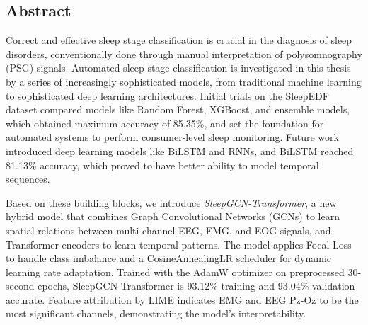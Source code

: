 \begin{center}
	\section*{\textcolor{internationalkleinblue}{\textbf{{Abstract}}}}
\end{center}

Correct and effective sleep stage classification is crucial in the diagnosis of sleep disorders, conventionally done through manual interpretation of polysomnography (PSG) signals. Automated sleep stage classification is investigated in this thesis by a series of increasingly sophisticated models, from traditional machine learning to sophisticated deep learning architectures. Initial trials on the SleepEDF dataset compared models like Random Forest, XGBoost, and ensemble models, which obtained maximum accuracy of 85.35\%, and set the foundation for automated systems to perform consumer-level sleep monitoring. Future work introduced deep learning models like BiLSTM and RNNs, and BiLSTM reached 81.13\% accuracy, which proved to have better ability to model temporal sequences.

Based on these building blocks, we introduce \textit{SleepGCN-Transformer}, a new hybrid model that combines Graph Convolutional Networks (GCNs) to learn spatial relations between multi-channel EEG, EMG, and EOG signals, and Transformer encoders to learn temporal patterns. The model applies Focal Loss to handle class imbalance and a CosineAnnealingLR scheduler for dynamic learning rate adaptation. Trained with the AdamW optimizer on preprocessed 30-second epochs, SleepGCN-Transformer is 93.12\% training and 93.04\% validation accurate. Feature attribution by LIME indicates EMG and EEG Pz-Oz to be the most significant channels, demonstrating the model's interpretability.


